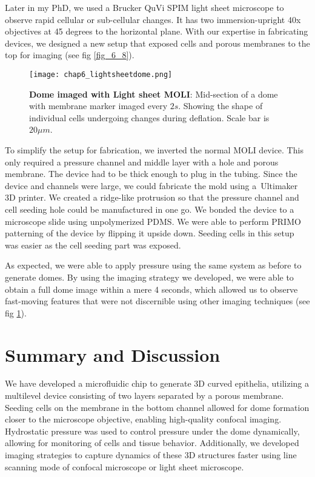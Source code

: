 Later in my PhD, we used a Brucker QuVi SPIM light sheet microscope to observe rapid cellular or sub-cellular changes. It has two immersion-upright 40x objectives at 45 degrees to the horizontal plane. With our expertise in fabricating devices, we designed a new setup that exposed cells and porous membranes to the top for imaging (see fig \ref{fig_6_8}).

\begin{figure}[h!]
	\centering
	\texttt{[image: chap6\_lightsheetdome.png]}
	\caption{ \textbf{Dome imaged with Light sheet MOLI}: Mid-section of a dome with membrane marker imaged every $2s$. Showing the shape of individual cells undergoing changes during deflation. Scale bar is $20 \mu m$.
	}\label{fig_6_9}
\end{figure}

To simplify the setup for fabrication, we inverted the normal MOLI device. This only required a pressure channel and middle layer with a hole and porous membrane. The device had to be thick enough to plug in the tubing. Since the device and channels were large, we could fabricate the mold using a Ultimaker 3D printer. We created a ridge-like protrusion so that the pressure channel and cell seeding hole could be manufactured in one go. We bonded the device to a microscope slide using unpolymerized PDMS. We were able to perform PRIMO patterning of the device by flipping it upside down. Seeding cells in this setup was easier as the cell seeding part was exposed.

As expected, we were able to apply pressure using the same system as before to generate domes. By using the imaging strategy we developed, we were able to obtain a full dome image within a mere 4 seconds, which allowed us to observe fast-moving features that were not discernible using other imaging techniques (see fig \ref{fig_6_9}).

\newpage

\hypertarget{summary-and-discussion}{%
\section{Summary and Discussion}\label{summary-and-discussion}}

We have developed a microfluidic chip to generate 3D curved epithelia, utilizing a multilevel device consisting of two layers separated by a porous membrane. Seeding cells on the membrane in the bottom channel allowed for dome formation closer to the microscope objective, enabling high-quality confocal imaging. Hydrostatic pressure was used to control pressure under the dome dynamically, allowing for monitoring of cells and tissue behavior. Additionally, we developed imaging strategies to capture dynamics of these 3D structures faster using line scanning mode of confocal microscope or light sheet microscope.  

